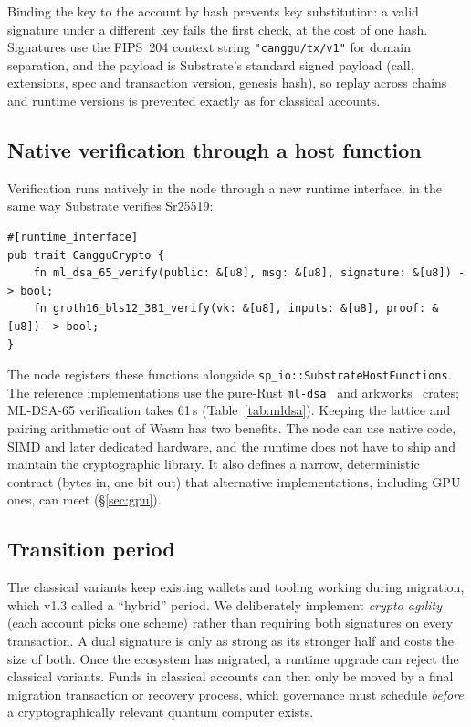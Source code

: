 \documentclass[11pt]{article}
\theoremstyle{definition}
\theoremstyle{remark}
\begin{document}
Binding the key to the account by hash prevents key substitution: a valid signature under a
different key fails the first check, at the cost of one hash. Signatures use the FIPS~204 context
string \texttt{"canggu/tx/v1"} for domain separation, and the payload is Substrate's standard signed
payload (call, extensions, spec and transaction version, genesis hash), so replay across chains and
runtime versions is prevented exactly as for classical accounts.

\subsection{Native verification through a host function}

Verification runs natively in the node through a new runtime interface, in the same way Substrate
verifies Sr25519:

\begin{lstlisting}
#[runtime_interface]
pub trait CangguCrypto {
    fn ml_dsa_65_verify(public: &[u8], msg: &[u8], signature: &[u8]) -> bool;
    fn groth16_bls12_381_verify(vk: &[u8], inputs: &[u8], proof: &[u8]) -> bool;
}
\end{lstlisting}

The node registers these functions alongside \texttt{sp\_io::SubstrateHostFunctions}. The
reference implementations use the pure-Rust \texttt{ml-dsa}~\cite{mldsarust} and
arkworks~\cite{arkworks} crates; ML-DSA-65 verification takes 61\,\textmu s (Table~\ref{tab:mldsa}).
Keeping the lattice and pairing arithmetic out of Wasm has two benefits. The node can use native
code, SIMD and later dedicated hardware, and the runtime does not have to ship and maintain the
cryptographic library. It also defines a narrow, deterministic contract (bytes in, one bit out)
that alternative implementations, including GPU ones, can meet (\S\ref{sec:gpu}).

\subsection{Transition period}

The classical variants keep existing wallets and tooling working during migration, which v1.3
called a ``hybrid'' period. We deliberately implement \emph{crypto agility} (each account picks
one scheme) rather than requiring both signatures on every transaction. A dual signature is only as
strong as its stronger half and costs the size of both. Once the ecosystem has migrated, a runtime
upgrade can reject the classical variants. Funds in classical accounts can then only be moved by
a final migration transaction or recovery process, which governance must schedule
\emph{before} a cryptographically relevant quantum computer exists.
\end{document}

